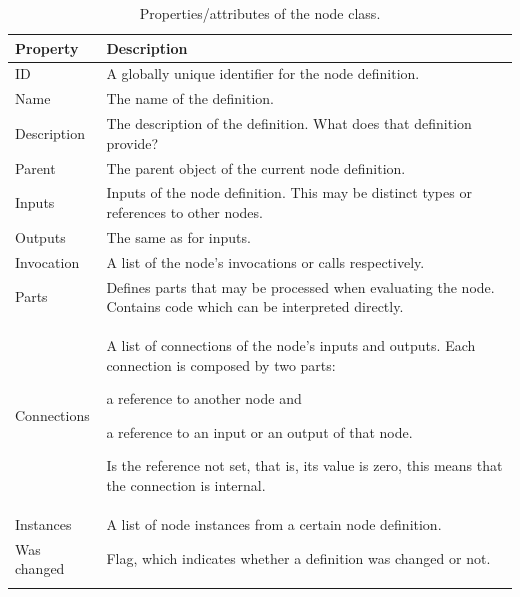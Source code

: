 \documentclass[%
    a4paper,    %
    justified,  %
    nobib,      %
    openany     %
]{tufte-book}
\begin{document}
\begin{table}[!htp]
  \begin{tabularx}{\linewidth}{lX}
    \toprule
    \textbf{Property} & \textbf{Description}\\
    \midrule
    ID          & A globally unique identifier for the node definition.          \\
    Name        & The name of the definition.                                    \\
    Description & The description of the definition. What does that definition
                  provide?                                                       \\
    Parent      & The parent object of the current node definition.              \\
    Inputs      & Inputs of the node definition. This may be distinct types or
                  references to other nodes.                                     \\
    Outputs     & The same as for inputs.                                        \\
    Invocation  & A list of the node's invocations or calls respectively.        \\
    Parts       & Defines parts that may be processed when evaluating the node.
                  Contains code which can be interpreted directly.               \\
    Connections & A list of connections of the node's inputs and outputs. Each
                  connection is composed by two parts:
                  \begin{enumerate*}
                    \item a reference to another node and
                    \item a reference to an input or an output of that node.
                  \end{enumerate*}
                  Is the reference not set, that is, its value is zero, this
                  means that the connection is internal.                         \\
    Instances   & A list of node instances from a certain node definition.       \\
    Was changed & Flag, which indicates whether a definition was changed or not. \\
    \bottomrule
  \vspace*{\baselineskip}
  \caption{Properties/attributes of the node class.}
  \label{table:node-properties}
  \end{tabularx}
\end{table}
\end{document}

